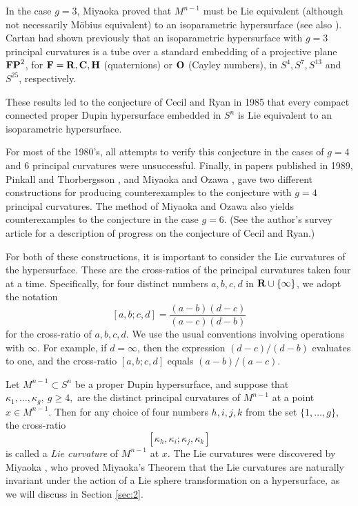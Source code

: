 \documentclass[12pt]{article}
\begin{document}
In the case $g=3$, Miyaoka
\cite{Mi1} proved that $M^{n-1}$ must be Lie equivalent (although not necessarily M\"{o}bius equivalent)
to an isoparametric hypersurface
(see also \cite{CCJ2}).  Cartan \cite{Car3} had shown previously that an isoparametric hypersurface with $g=3$
principal curvatures is a tube over a standard 
embedding of a projective plane ${\bf FP}^2$,
for ${\bf F} = {\bf R}, {\bf C}, {\bf H}$ (quaternions) or ${\bf O}$ (Cayley numbers), 
in $S^4, S^7, S^{13}$
and $S^{25}$, respectively. 

These results led to the conjecture of Cecil and Ryan \cite[p. 184]{CR7} in 1985
that every compact connected proper Dupin hypersurface embedded in $S^n$ is Lie equivalent to an isoparametric
hypersurface. 

For most of the 1980's, all attempts to verify this conjecture in the cases of $g=4$ and 6 principal curvatures were unsuccessful.  
Finally, in papers published in 1989,
Pinkall and Thorbergsson 
\cite{PT1}, and Miyaoka and Ozawa \cite{MO}, gave two different constructions for producing
counterexamples to the conjecture with $g =4$ principal curvatures.  The method of Miyaoka and Ozawa also yields
counterexamples to the conjecture in the case $g=6$.  (See the author's survey article \cite{Cec10} for a description of progress on the conjecture of Cecil and Ryan.)

For both of these constructions, it is important to consider the Lie curvatures of the hypersurface.  These
are the cross-ratios of the principal curvatures taken four at a time. Specifically,
for four distinct numbers $a,b,c,d$ in ${\bf R} \cup \{\infty\}$, we adopt the notation
\begin{equation}
\label{eq:3.5.4}
[a,b;c,d] = \frac{(a-b)(d-c)}{(a-c)(d-b)}
\end{equation} 
for the cross-ratio of $a,b,c,d$.  We use the usual conventions involving operations with $\infty$.
For example, if $d= \infty$, then the expression $(d-c)/(d-b)$ evaluates to one,
and the cross-ratio $[a,b;c,d]$ equals $(a-b)/(a-c)$.

Let $M^{n-1} \subset S^n$ be a proper Dupin hypersurface, and suppose
that $\kappa_1,\ldots,\kappa_g, \ g \geq 4,$ are the distinct principal curvatures of $M^{n-1}$ at a point
$x \in M^{n-1}$. Then for any choice of four numbers $h,i,j,k$ from the set $\{1,\ldots,g\}$, the cross-ratio
\begin{equation}
\label{eq:3.5.5}
[\kappa_h,\kappa_i;\kappa_j, \kappa_k]
\end{equation} 
is called a {\em Lie curvature} of $M^{n-1}$ at $x$.
The Lie curvatures were discovered by Miyaoka \cite{Mi3}, who proved Miyaoka's Theorem that the Lie curvatures
are naturally invariant under the action of a Lie sphere transformation on a hypersurface, as we will discuss in Section \ref{sec:2}.
\end{document}
